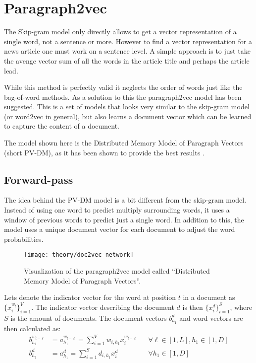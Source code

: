 
\section{Paragraph2vec}

The Skip-gram model only directly allows to get a vector representation of a single word, not a sentence or more. However to find a vector representation for a news article one must work on a sentence level. A simple approach is to just take the avenge vector sum of all the words in the article title and perhaps the article lead.

While this method is perfectly valid it neglects the order of words just like the bag-of-word methods. As a solution to this the paragraph2vec model has been suggested. This is a set of models that looks very similar to the skip-gram model (or word2vec in general), but also learns a document vector which can be learned to capture the content of a document.

The model shown here is the Distributed Memory Model of Paragraph Vectors (short PV-DM), as it has been shown to provide the best results \cite{doc2vec}. 

\subsection{Forward-pass}

The idea behind the PV-DM model is a bit different from the skip-gram model. Instead of using one word to predict multiply surrounding words, it uses a window of previous words to predict just a single word. In addition to this, the model uses a unique document vector for each document to adjust the word probabilities.

\begin{figure}[H]
	\centering
	\texttt{[image: theory/doc2vec-network]}
	\caption{Visualization of the paragraph2vec model called ``Distributed Memory Model of Paragraph Vectors''.}
	\label{fig:theory:doc2vec:network}
\end{figure}

Lets denote the indicator vector for the word at position $t$ in a document as $\{x_i^{w_t}\}_{i=1}^V$. The indicator vector describing the document $d$ is then $\{x_i^d\}_{i=1}^S$, where $S$ is the amount of documents. The document vectors $b_{h_1}^d$ and word vectors are then calculated as:
\begin{equation}
\begin{aligned}
b_{h_1}^{w_{t-\ell}} &= a_{h_1}^{w_{t-\ell}} = \sum_{i=1}^V w_{i,h_1} x_{i}^{w_{t-\ell}} && \forall \ell \in [1, L], h_1 \in [1, D] \\
b_{h_1}^d &= a_{h_1}^d = \sum_{i=1}^S d_{i,h_1} x_{i}^d && \forall h_1 \in [1, D]
\end{aligned}
\end{equation}

